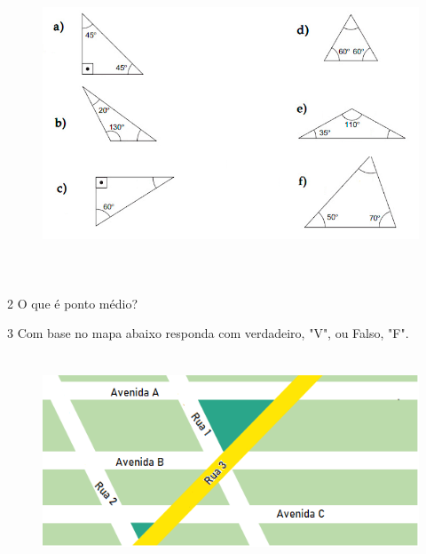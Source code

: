 \begin{figure}
\includegraphics[width=5.90625in,height=3.63542in]{./imgSAEB_6_MAT/media/image52.png}
\end{figure}

\begin{escolha}
\item {}
\item {}
\item {}
\item {}
\item {}
\item {}
\end{escolha}

\num{2}  O que é ponto médio?


\num{3}  Com base no mapa abaixo responda com verdadeiro, "V", ou Falso, "F".

\begin{figure}
\centering\includegraphics[width=5.47917in,height=2.48958in]{./imgSAEB_6_MAT/media/image53.png}
\end{figure}


